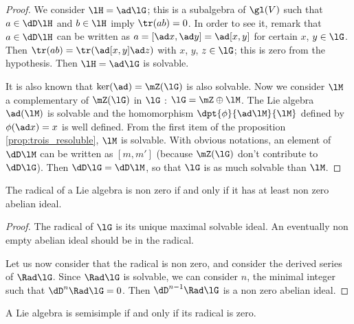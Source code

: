 \begin{proof}
We consider $\lH=\ad\lG$; this is a subalgebra of $\gl(V)$ such that $a\in\dD\lH$ and $b\in\lH$ imply $\tr(ab)=0$. In order to see it, remark that $a\in\dD\lH$ can be written as $a=[\ad x,\ad y]=\ad[x,y]$ for certain $x$, $y\in\lG$. Then $\tr(ab)=\tr(\ad[x,y]\ad z)$ with $x$, $y$, $z\in\lG$; this is zero from the hypothesis. Then $\lH=\ad\lG$ is solvable.

It is also known that $\ker(\ad)=\mZ(\lG)$ is also solvable. Now we consider $\lM$ a complementary of $\mZ(\lG)$ in $\lG$ : $\lG=\mZ\oplus\lM$. The Lie algebra $\ad(\lM)$ is solvable and the homomorphism $\dpt{\phi}{\ad\lM}{\lM}$ defined by $\phi(\ad x)=x$ is well defined. From the first item of the proposition \ref{prop:trois_resoluble}, $\lM$ is solvable. With obvious notations, an element of $\dD\lM$ can be written as $[m,m']$ (because $\mZ(\lG)$ don't contribute to $\dD\lG$). Then $\dD\lG=\dD\lM$, so that $\lG$ is as much solvable than $\lM$.
\end{proof}


\begin{lemma}
The radical of a Lie algebra is non zero if and only if it has at least non zero abelian ideal.
\label{lem:ss_ideal}
\end{lemma}

\begin{proof}
The radical of $\lG$ is its unique maximal solvable ideal. An eventually non empty abelian ideal should be in the radical.

Let us now consider that the radical is non zero, and consider the derived series of $\Rad\lG$. Since $\Rad\lG$ is solvable, we can consider $n$, the minimal integer such that $\dD^n\Rad\lG=0$. Then $\dD^{n-1}\Rad\lG$ is a non zero abelian ideal.
\end{proof}


\begin{theorem}     \label{ThoRadicalEquivSS}
A Lie algebra is semisimple if and only if its radical is zero.
\end{theorem}

